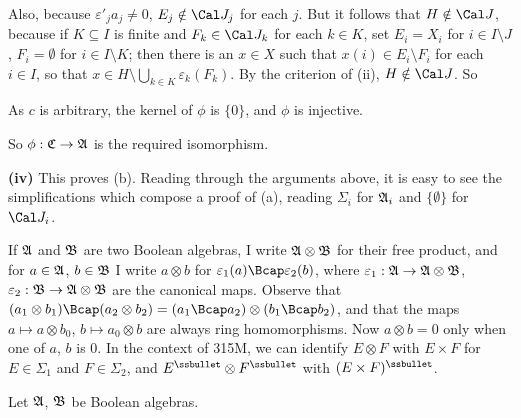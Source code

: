 {

\noindent Also, because $\varepsilon'_ja_j\ne 0$, $E_j\notin\Cal J_j$
for each $j$.   But it follows that $H\notin\Cal J$, because if
$K\subseteq I$ is finite and $F_k\in\Cal J_k$ for each $k\in K$, set
$E_i=X_i$ for $i\in I\setminus J$, $F_i=\emptyset$ for
$i\in I\setminus K$;  then there is an $x\in X$ such that
$x(i)\in E_i\setminus F_i$ for
each $i\in I$, so that
$x\in H\setminus\bigcup_{k\in K}\varepsilon_k(F_k)$.   By the
criterion of (ii), $H\notin\Cal J$.   So


\noindent As $c$ is arbitrary, the kernel of $\phi$ is $\{0\}$, and
$\phi$ is injective.   \Qed

So $\phi:\frak C\to\frak A$ is the required isomorphism.

\medskip

{\bf (iv)} This proves (b).   Reading through the arguments above, it is
easy to see the simplifications which compose a proof of (a), reading
$\Sigma_i$ for $\frak A_i$ and $\{\emptyset\}$ for $\Cal J_i$.
}%

   If
$\frak A$ and $\frak B$ are two Boolean algebras, I write $\frak
A\otimes\frak B$ for their free product, and for $a\in\frak A$,
$b\in\frak B$ I write $a\otimes b$ for
$\varepsilon_1(a)\Bcap\varepsilon_2(b)$, where $\varepsilon_1:\frak
A\to\frak A\otimes\frak B$,
$\varepsilon_2:\frak B\to\frak A\otimes\frak B$ are the canonical maps.
Observe that $(a_1\otimes
b_1)\Bcap(a_2\otimes b_2)=(a_1\Bcap a_2)\otimes(b_1\Bcap b_2)$, and that
the maps $a\mapsto a\otimes b_0$, $b\mapsto a_0\otimes b$ are always
ring homomorphisms.   Now $a\otimes
b=0$ only
when one of $a$, $b$ is $0$.   In the context of 315M, we can identify
$E\otimes F$ with $E\times F$ for $E\in\Sigma_1$ and $F\in\Sigma_2$, and
$E^{\ssbullet}\otimes F^{\ssbullet}$ with $(E\times F)^{\ssbullet}$.

Let $\frak A$, $\frak B$ be Boolean algebras.

